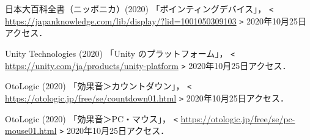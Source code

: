 \documentclass[a4paper, papersize, titlepage]{jsarticle}
\begin{document}
\begin{multicols}{2}

\begin{thebibliography}{99}

日本大百科全書（ニッポニカ）(2020)
「ポインティングデバイス」，
\verb|<| \url{https://japanknowledge.com/lib/display/?lid=1001050309103} \verb|>|
2020年10月25日アクセス．

Unity Technologies (2020)
「Unity のプラットフォーム」，
\verb|<| \url{https://unity.com/ja/products/unity-platform} \verb|>|
2020年10月25日アクセス．

OtoLogic (2020)
「効果音＞カウントダウン」，
\verb|<| \url{https://otologic.jp/free/se/countdown01.html} \verb|>|
2020年10月25日アクセス．

OtoLogic (2020)
「効果音＞PC・マウス」，
\verb|<| \url{https://otologic.jp/free/se/pc-mouse01.html} \verb|>|
2020年10月25日アクセス．
\end{thebibliography}

\end{multicols}
\end{document}
